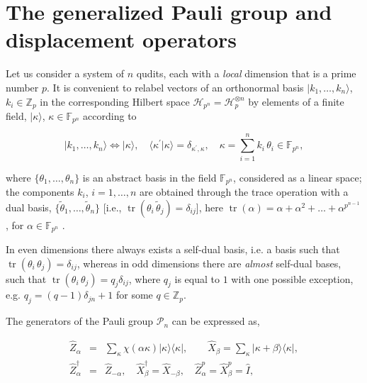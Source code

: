 \documentclass[quantumrep,article,submit,pdftex,moreauthors]{Definitions/mdpi}
\DeclareMathOperator{\tr}{tr}
\providecommand{\DIFaddbegin}{} %
\providecommand{\DIFaddend}{} %
\begin{document}
\DIFaddend %

\DIFaddbegin 

\DIFaddend \section{The generalized Pauli group and displacement operators}

Let us consider a system of $n$ qudits, each with a \textit{local} dimension
that is a prime number $p$. It is convenient to relabel vectors of an
orthonormal basis $|k_{1},\ldots,k_{n}\rangle$, $k_{i} \in \mathbb{Z}_{p}$ in
the corresponding Hilbert space $\mathcal{H}_{p^{n}}=\mathcal{H}_{p}^{\otimes
n}$ by elements of a finite field, $|\kappa\rangle$, $\kappa \in
\mathbb{F}_{p^{n}}$ according to

\begin{equation}
  |k_{1},\ldots,k_{n}\rangle
  \Leftrightarrow |\kappa\rangle,
  \quad \langle\kappa^{\prime}|\kappa\rangle
  = \delta_{\kappa^{\prime},\kappa},
  \quad \kappa
  = \sum_{i=1}^{n} k_{i} \, \theta_{i} \in \mathbb{F}_{p^{n}},
  \label{basis}
\end{equation}

where $\{\theta_{1},\ldots,\theta_{n}\}$ is an abstract basis in the field
$\mathbb{F}_{p^{n}}$, considered as a linear space; the components $k_{i}$,
$i=1,\ldots,n$ are obtained through the trace operation with a dual basis,
$\{\tilde{\theta}_{1},\ldots,\tilde{\theta}_{n}\}$ [i.e.,
$\tr(\theta_{i}\,\tilde{\theta}_{j})=\delta_{ij}$], here $\tr(\alpha)=\alpha
+\alpha^{2}+\ldots+\alpha^{p^{n-1}}$, for $\alpha \in \mathbb{F}_{p^{n}}$
\cite{FF}.

In even dimensions there always exists a self-dual basis, i.e. a basis such that
$\tr(\theta_{i}\,\theta_{j})=\delta_{ij}$, whereas in odd dimensions there are
\textit{almost} self-dual bases, such that
$\tr(\theta_{i}\,\theta_{j})=q_{j}\delta_{ij}$, where $q_{j}$ is equal to $1$
with one possible exception, e.g. $q_{j}=(q-1)\delta_{jn}+1$ for some $q \in
\mathbb{Z}_p$.

The generators of the Pauli group $\mathcal{P}_{n}$ can be expressed as,

\begin{eqnarray}
  \hat{Z}_{\alpha}
  &=& \sum_{\kappa}\chi\left( \alpha\kappa \right)
  |\kappa\rangle \langle\kappa|,
  \qquad \hat{X}_{\beta}
  = \sum_{\kappa} |\kappa + \beta\rangle \langle\kappa|,
  \label{XZ} \\
  \hat{Z}_{\alpha }^{\dagger}
  &=& \hat{Z}_{-\alpha}, \quad \hat{X}_{\beta }^{\dagger}
  = \hat{X}_{-\beta}, \quad \hat{Z}_{\alpha}^{p}
  = \hat{X}_{\beta}^{p} = \hat{I},
\end{eqnarray}
\end{document}
